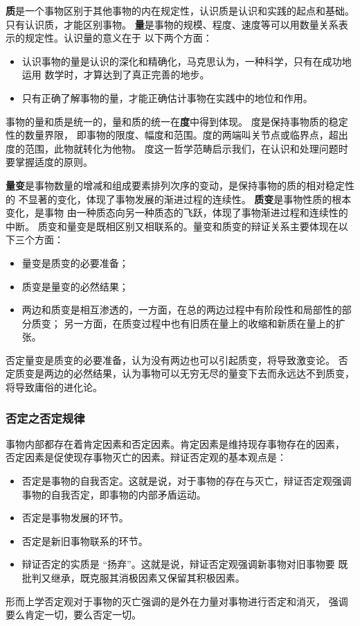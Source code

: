 \documentclass[utf-8, 10pt]{article}
\begin{document}
\textbf{质}是一个事物区别于其他事物的内在规定性，认识质是认识和实践的起点和基础。
只有认识质，才能区别事物。
\textbf{量}是事物的规模、程度、速度等可以用数量关系表示的规定性。认识量的意义在于
以下两个方面：
\begin{itemize}[itemsep=0pt]
    \item 认识事物的量是认识的深化和精确化，马克思认为，一种科学，只有在成功地运用
    数学时，才算达到了真正完善的地步。
    \item 只有正确了解事物的量，才能正确估计事物在实践中的地位和作用。
\end{itemize}

事物的量和质是统一的，量和质的统一在\textbf{度}中得到体现。
度是保持事物质的稳定性的数量界限，
即事物的限度、幅度和范围。度的两端叫关节点或临界点，超出度的范围，此物就转化为他物。
度这一哲学范畴启示我们，在认识和处理问题时要掌握适度的原则。

\textbf{量变}是事物数量的增减和组成要素排列次序的变动，是保持事物的质的相对稳定性的
不显著的变化，体现了事物发展的渐进过程的连续性。
\textbf{质变}是事物性质的根本变化，是事物
由一种质态向另一种质态的飞跃，体现了事物渐进过程和连续性的中断。
质变和量变是既相区别又相联系的。量变和质变的辩证关系主要体现在以下三个方面：
\begin{itemize}[itemsep=0pt]
    \item 量变是质变的必要准备；
    \item 质变是量变的必然结果；
    \item 两边和质变是相互渗透的，一方面，在总的两边过程中有阶段性和局部性的部分质变；
    另一方面，在质变过程中也有旧质在量上的收缩和新质在量上的扩张。
\end{itemize}
否定量变是质变的必要准备，认为没有两边也可以引起质变，将导致激变论。
否定质变是两边的必然结果，认为事物可以无穷无尽的量变下去而永远达不到质变，
将导致庸俗的进化论。

\subsubsection{否定之否定规律}

事物内部都存在着肯定因素和否定因素。肯定因素是维持现存事物存在的因素，
否定因素是促使现存事物灭亡的因素。辩证否定观的基本观点是：
\begin{itemize}[itemsep=0pt]
    \item 否定是事物的自我否定。这就是说，对于事物的存在与灭亡，辩证否定观强调
    事物的自我否定，即事物的内部矛盾运动。
    \item 否定是事物发展的环节。
    \item 否定是新旧事物联系的环节。
    \item 辩证否定的实质是 “扬弃”。这就是说，辩证否定观强调新事物对旧事物要
    既批判又继承，既克服其消极因素又保留其积极因素。
\end{itemize}
形而上学否定观对于事物的灭亡强调的是外在力量对事物进行否定和消灭，
强调要么肯定一切，要么否定一切。
\end{document}
